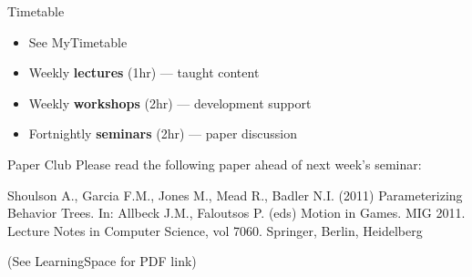 \begin{frame}{Timetable}
	\begin{itemize}
		\pause\item See MyTimetable
		\pause\item Weekly \textbf{lectures} (1hr) --- taught content
		\pause\item Weekly \textbf{workshops} (2hr) --- development support
		\pause\item Fortnightly \textbf{seminars} (2hr) --- paper discussion
	\end{itemize}
\end{frame}

\begin{frame}{Paper Club}
    Please read the following paper ahead of next week's seminar:
    
    Shoulson A., Garcia F.M., Jones M., Mead R., Badler N.I. (2011) Parameterizing Behavior Trees. In: Allbeck J.M., Faloutsos P. (eds) Motion in Games. MIG 2011. Lecture Notes in Computer Science, vol 7060. Springer, Berlin, Heidelberg
    
    (See LearningSpace for PDF link)
\end{frame}

